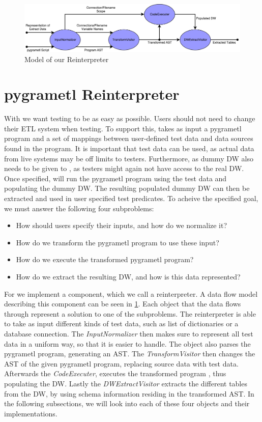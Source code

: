 \begin{figure}
  \centering
  \includegraphics[width=1\textwidth]{figures/reinterpreter_model.pdf}
  \caption{Model of our Reinterpreter}
  \label{fig:reinterpreter}
\end{figure}


\section{pygrametl Reinterpreter}
With  \FW{} we want testing to be as easy as possible. Users should not need to  change their ETL system when testing. To support this, \FW{} takes as input a pygrametl program and a set of mappings between user-defined test data and data sources found in the program. It is important that test data can be used, as actual data from live systems may be off limits to testers. Furthermore, as dummy DW also needs to be given to \FW{}, as testers might again not have access to the real DW. Once specified, \FW{} will run the pygrametl program using the test data and populating the dummy DW. The resulting populated dummy DW can then be extracted and used in user specified test predicates. To acheive the specified goal, we must answer the following four subproblems: 


\begin{itemize}
\item How should users specify their inputs, and how do we normalize it?
\item How do we transform the pygrametl program to use these input?
\item How do we execute the transformed pygrametl program?
\item How do we extract the resulting DW, and how is this data represented? 
\end{itemize}

For \FW{} we implement a component, which we call a reinterpreter. A data flow model describing this component can be seen in \cref{fig:reinterpreter}. Each object that the data flows through represent a solution to one of the subproblems. The reinterpreter is able to take as input different kinds of test data, such as list of dictionaries or a database connection. The \textit{InputNormalizer} then makes sure to represent all test data in a uniform way, so that it is easier to handle. The object also parses the pygrametl program, generating an AST. The \textit{TransformVisitor} then changes the AST of the given pygrametl program, replacing source data with test data. Afterwards the \textit{CodeExecuter}, executes the transformed program , thus populating the DW. Lastly the \textit{DWExtractVisitor} extracts the different tables from the DW, by using schema information residing in the transformed AST. In the following subsections, we will look into each of these four objects and their implementations.

